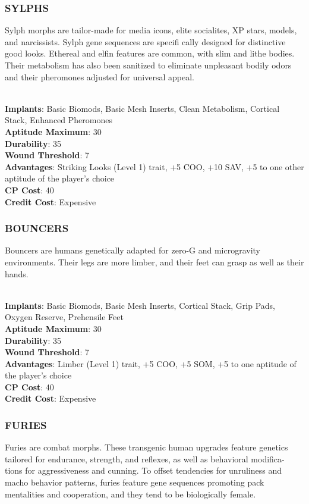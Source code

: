 \subsubsection{SYLPHS}
Sylph morphs are tailor-made for media icons, elite socialites, XP stars,
models, and narcissists. Sylph gene sequences are specifi cally designed for
distinctive good looks. Ethereal and elfin features are common, with slim and
lithe bodies. Their metabolism has also been sanitized to eliminate
unpleasant bodily odors and their pheromones adjusted for universal appeal.

\\ \textbf{Implants}: Basic Biomods, Basic Mesh Inserts, Clean Metabolism, Cortical Stack, Enhanced Pheromones
\\ \textbf{Aptitude Maximum}: 30
\\ \textbf{Durability}: 35
\\ \textbf{Wound Threshold}: 7
\\ \textbf{Advantages}: Striking Looks (Level 1) trait, +5 COO, +10 SAV, +5 to one other aptitude of the player’s choice
\\ \textbf{CP Cost}: 40
\\ \textbf{Credit Cost}: Expensive

\subsubsection{BOUNCERS}
Bouncers are humans genetically adapted for zero-G and microgravity
environments. Their legs are more limber, and their feet can grasp as well as
their hands.

\\ \textbf{Implants}: Basic Biomods, Basic Mesh Inserts, Cortical
Stack, Grip Pads, Oxygen Reserve, Prehensile Feet
\\ \textbf{Aptitude Maximum}: 30
\\ \textbf{Durability}: 35
\\ \textbf{Wound Threshold}: 7
\\ \textbf{Advantages}: Limber (Level 1) trait, +5 COO, +5 SOM,
+5 to one aptitude of the player’s choice
\\ \textbf{CP Cost}: 40
\\ \textbf{Credit Cost}: Expensive

\subsubsection{FURIES}
Furies are combat morphs. These transgenic human upgrades feature genetics
tailored for endurance, strength, and reflexes, as well as behavioral modifica-
tions for aggressiveness and cunning. To offset tendencies for unruliness and
macho behavior patterns, furies feature gene sequences promoting pack
mentalities and cooperation, and they tend to be biologically female.

